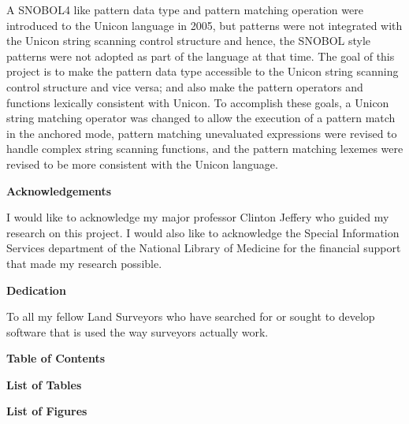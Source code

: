 \documentclass{article}
\begin{document}
A SNOBOL4 like pattern data type and pattern matching operation were introduced to the Unicon language in 2005, but patterns were not integrated with the Unicon string scanning control structure and hence, the SNOBOL style patterns were not adopted as part of the language at that time.  The goal of this project is to make the pattern data type accessible to the Unicon string scanning control structure and vice versa; and also make the pattern operators and functions lexically consistent with Unicon.  To accomplish these goals, a Unicon string matching operator was changed to allow the execution of a pattern match in the anchored mode, pattern matching unevaluated expressions were revised to handle complex string scanning functions, and the pattern matching lexemes were revised to be more consistent with the Unicon language.

\pagebreak

\begin{center}
\textbf{Acknowledgements}
\end{center}
I would like to acknowledge my major professor Clinton Jeffery who guided my research on this project.  I would also like to acknowledge the Special Information Services department of the National Library of Medicine for the financial support that made my research possible.

\pagebreak

\begin{center}
\textbf{Dedication}
\end{center}
To all my fellow Land Surveyors who have searched for or sought to develop software that is used the way surveyors actually work. 

\pagebreak
\linespread{1}
\begin{center}
\textbf{Table of Contents}
\end{center}
\tableofcontents

\pagebreak
\begin{center}
\textbf{List of Tables}
\end{center}
\listoftables
	
\pagebreak
\begin{center}
\textbf{List of Figures}
\end{center}
\listoffigures

\pagebreak
\end{document}
